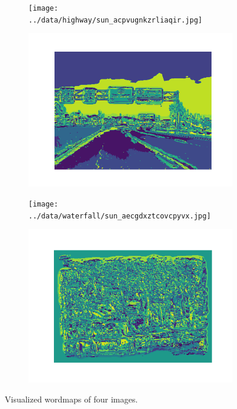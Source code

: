 \documentclass{article} %
\begin{document}
\begin{figure}[h]
\begin{subfigure}[b]{0.5\textwidth}
        \end{subfigure}
        \begin{subfigure}[b]{0.5\textwidth}
            \texttt{[image: ../data/highway/sun\_acpvugnkzrliaqir.jpg]}
        \end{subfigure}
        \begin{subfigure}[b]{0.5\textwidth}
            \includegraphics[width=\textwidth]{q1,3_3.png}
        \end{subfigure}
        \begin{subfigure}[b]{0.5\textwidth}
            \texttt{[image: ../data/waterfall/sun\_aecgdxztcovcpyvx.jpg]}
        \end{subfigure}
        \begin{subfigure}[b]{0.5\textwidth}
            \includegraphics[width=\textwidth]{q1,3_4.png}
        \end{subfigure}
        \caption{Visualized wordmaps of four images.}
        \label{q13}
    \end{figure}
    
\end{document}

